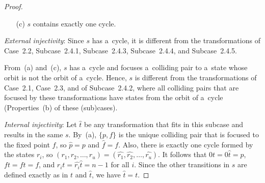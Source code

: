 \documentclass{amsart}
\newcommand{\e}[1]{\hat{#1}}
\begin{document}
\begin{proof}
\begin{enumerate}
\item[(c)] $s$ contains exactly one cycle.
\end{enumerate}

\textit{External injectivity}:
Since $s$ has a~cycle, it is different from the transformations of Case~2.2, Subcase~2.4.1, Subcase~2.4.3, Subcase~2.4.4, and Subcase~2.4.5.

From~(a) and~(c), $s$ has a~cycle and focuses a~colliding pair to a~state whose orbit is not the orbit of a~cycle.
Hence, $s$ is different from the transformations of Case~2.1, Case~2.3, and of Subcase~2.4.2,
where all colliding pairs that are focused by these transformations have states from the orbit of a~cycle (Properties~(b) of these (sub)cases).

\textit{Internal injectivity}:
Let $\e{t}$ be any transformation that fits in this subcase and results in the same $s$.
By~(a), $\{p,f\}$ is the unique colliding pair that is focused to the fixed point $f$, so $\e{p}=p$ and $\e{f}=f$.
Also, there is exactly one cycle formed by the states $r_i$, so $(r_1,r_2,\ldots,r_u) = (\e{r_1},\e{r_2},\ldots,\e{r_u})$.
It follows that $0t = 0\e{t} = p$, $ft = f\e{t} = f$, and $r_i t = \e{r_i} \e{t} = n-1$ for all $i$.
Since the other transitions in $s$ are defined exactly as in $t$ and $\e{t}$, we have $\e{t} = t$.


\end{proof}
\end{document}
